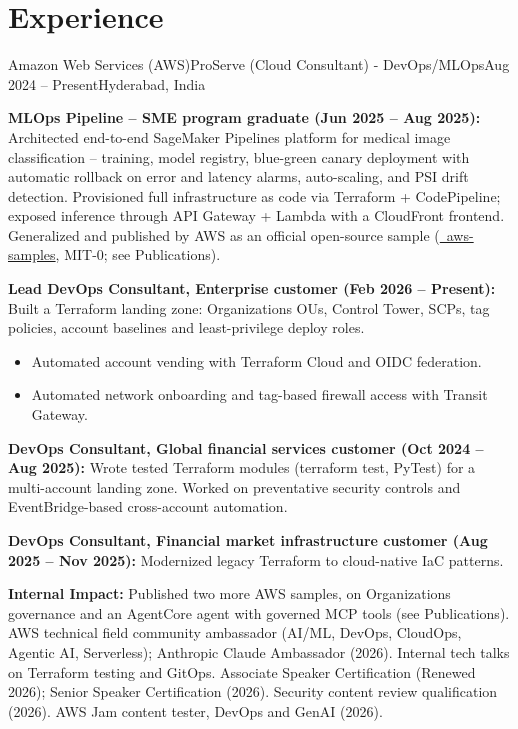 \section{\textbf{Experience}}
\resumeSubHeadingListStart

\resumeExp
{Amazon Web Services (AWS)}{ProServe (Cloud Consultant) - DevOps/MLOps}{Aug 2024 -- Present}{Hyderabad, India}
\resumeItemListStart
    \item[$\diamond$] \textbf{MLOps Pipeline -- SME program graduate (Jun 2025 -- Aug 2025):} Architected end-to-end SageMaker Pipelines platform for medical image classification -- training, model registry, blue-green canary deployment with automatic rollback on error and latency alarms, auto-scaling, and PSI drift detection. Provisioned full infrastructure as code via Terraform + CodePipeline; exposed inference through API Gateway + Lambda with a CloudFront frontend. Generalized and published by AWS as an official open-source sample (\href{https://github.com/aws-samples/sample-sagemaker-image-classification-mlops}{\faGithub\ aws-samples}, MIT-0; see Publications).
    \item[$\diamond$] \textbf{Lead DevOps Consultant, Enterprise customer (Feb 2026 -- Present):} Built a Terraform landing zone: Organizations OUs, Control Tower, SCPs, tag policies, account baselines and least-privilege deploy roles.
    \begin{itemize}[leftmargin=2.5ex, noitemsep, topsep=0pt, labelsep=1.2mm]
        \item[$\circ$] Automated account vending with Terraform Cloud and OIDC federation.
        \item[$\circ$] Automated network onboarding and tag-based firewall access with Transit Gateway.
    \end{itemize}
    \item[$\diamond$] \textbf{DevOps Consultant, Global financial services customer (Oct 2024 -- Aug 2025):} Wrote tested Terraform modules (terraform test, PyTest) for a multi-account landing zone. Worked on preventative security controls and EventBridge-based cross-account automation.
    \item[$\diamond$] \textbf{DevOps Consultant, Financial market infrastructure customer (Aug 2025 -- Nov 2025):} Modernized legacy Terraform to cloud-native IaC patterns.
    \item[$\diamond$] \textbf{Internal Impact:} Published two more AWS samples, on Organizations governance and an AgentCore agent with governed MCP tools (see Publications). AWS technical field community ambassador (AI/ML, DevOps, CloudOps, Agentic AI, Serverless); Anthropic Claude Ambassador (2026). Internal tech talks on Terraform testing and GitOps. Associate Speaker Certification (Renewed 2026); Senior Speaker Certification (2026). Security content review qualification (2026). AWS Jam content tester, DevOps and GenAI (2026).
\resumeItemListEnd

